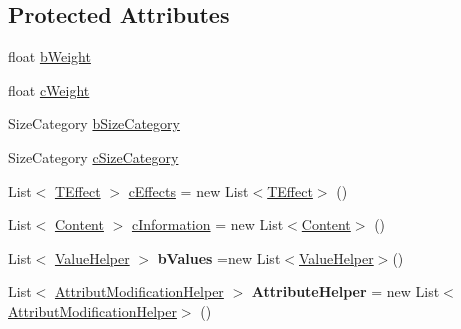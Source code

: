 \subsection*{Protected Attributes}
\begin{DoxyCompactItemize}
\item 
float \hyperlink{class_r_p_g_object_a550507f127d2915aa0b7a95ef5e3feb6}{b\+Weight}
\item 
float \hyperlink{class_r_p_g_object_a098dcfa4772557888348f5164da509f8}{c\+Weight}
\item 
Size\+Category \hyperlink{class_r_p_g_object_ae5cb76ccbe4f37237cc03a9737009577}{b\+Size\+Category}
\item 
Size\+Category \hyperlink{class_r_p_g_object_a5076aeba98770e8507778eb6051df87b}{c\+Size\+Category}
\item 
List$<$ \hyperlink{class_t_effect}{T\+Effect} $>$ \hyperlink{class_r_p_g_object_a833cf33788a1040a7fdcb703d6e3126d}{c\+Effects} = new List$<$\hyperlink{class_t_effect}{T\+Effect}$>$ ()
\item 
List$<$ \hyperlink{struct_content}{Content} $>$ \hyperlink{class_r_p_g_object_ac5b133eca19e8f97988722018cdf139b}{c\+Information} = new List$<$\hyperlink{struct_content}{Content}$>$ ()
\item 
\hypertarget{class_r_p_g_object_aca7f376707b78c0852b0001ee67dc80f}{}List$<$ \hyperlink{class_r_p_g_object_1_1_value_helper}{Value\+Helper} $>$ {\bfseries b\+Values} =new List$<$\hyperlink{class_r_p_g_object_1_1_value_helper}{Value\+Helper}$>$()\label{class_r_p_g_object_aca7f376707b78c0852b0001ee67dc80f}

\item 
\hypertarget{class_r_p_g_object_a19aea805ab96ccaa5bd202bebe6ff482}{}List$<$ \hyperlink{class_r_p_g_object_1_1_attribut_modification_helper}{Attribut\+Modification\+Helper} $>$ {\bfseries Attribute\+Helper} = new List$<$\hyperlink{class_r_p_g_object_1_1_attribut_modification_helper}{Attribut\+Modification\+Helper}$>$ ()\label{class_r_p_g_object_a19aea805ab96ccaa5bd202bebe6ff482}

\end{DoxyCompactItemize}
